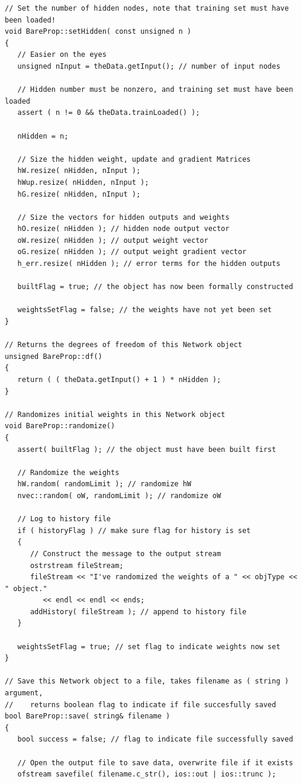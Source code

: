 \documentclass{report}[10pt]
\begin{document}
\begin{verbatim}
// Set the number of hidden nodes, note that training set must have been loaded!
void BareProp::setHidden( const unsigned n )
{
   // Easier on the eyes
   unsigned nInput = theData.getInput(); // number of input nodes
   
   // Hidden number must be nonzero, and training set must have been loaded
   assert ( n != 0 && theData.trainLoaded() );
   
   nHidden = n;

   // Size the hidden weight, update and gradient Matrices
   hW.resize( nHidden, nInput );
   hWup.resize( nHidden, nInput );
   hG.resize( nHidden, nInput );

   // Size the vectors for hidden outputs and weights
   hO.resize( nHidden ); // hidden node output vector
   oW.resize( nHidden ); // output weight vector
   oG.resize( nHidden ); // output weight gradient vector
   h_err.resize( nHidden ); // error terms for the hidden outputs

   builtFlag = true; // the object has now been formally constructed

   weightsSetFlag = false; // the weights have not yet been set
}

// Returns the degrees of freedom of this Network object
unsigned BareProp::df()
{
   return ( ( theData.getInput() + 1 ) * nHidden );
}

// Randomizes initial weights in this Network object
void BareProp::randomize()
{
   assert( builtFlag ); // the object must have been built first
   
   // Randomize the weights
   hW.random( randomLimit ); // randomize hW
   nvec::random( oW, randomLimit ); // randomize oW

   // Log to history file
   if ( historyFlag ) // make sure flag for history is set
   {
      // Construct the message to the output stream
      ostrstream fileStream;
      fileStream << "I've randomized the weights of a " << objType << " object."
         << endl << endl << ends;
      addHistory( fileStream ); // append to history file
   }

   weightsSetFlag = true; // set flag to indicate weights now set
}

// Save this Network object to a file, takes filename as ( string ) argument,
//    returns boolean flag to indicate if file succesfully saved
bool BareProp::save( string& filename )
{
   bool success = false; // flag to indicate file successfully saved
   
   // Open the output file to save data, overwrite file if it exists
   ofstream savefile( filename.c_str(), ios::out | ios::trunc );
   

\end{verbatim}
\end{document}
